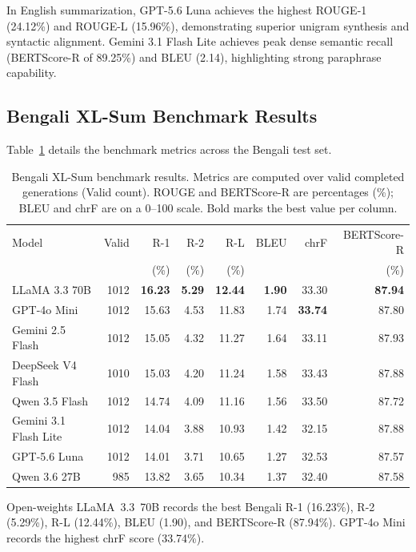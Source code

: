\documentclass[runningheads]{llncs}
\begin{document}
In English summarization, GPT-5.6 Luna achieves the highest ROUGE-1 (24.12\%) and ROUGE-L (15.96\%), demonstrating superior unigram synthesis and syntactic alignment. Gemini 3.1 Flash Lite achieves peak dense semantic recall (BERTScore-R of 89.25\%) and BLEU (2.14), highlighting strong paraphrase capability.

\subsection{Bengali XL-Sum Benchmark Results}\label{subsec:bengali_results}

Table~\ref{tab:bengali_results} details the benchmark metrics across the Bengali test set.

\begin{table}[t]
\caption{Bengali XL-Sum benchmark results. Metrics are computed over valid completed generations (Valid count). ROUGE and BERTScore-R are percentages (\%); BLEU and chrF are on a 0--100 scale. Bold marks the best value per column.}\label{tab:bengali_results}
\centering
\footnotesize
\begin{tabular}{p{3.2cm}rrrrrrr}
\toprule
Model & Valid & R-1 & R-2 & R-L & BLEU & chrF & BERTScore-R \\
 & & (\%) & (\%) & (\%) & & & (\%) \\
\midrule
LLaMA 3.3 70B & 1012 & \textbf{16.23} & \textbf{5.29} & \textbf{12.44} & \textbf{1.90} & 33.30 & \textbf{87.94} \\
GPT-4o Mini & 1012 & 15.63 & 4.53 & 11.83 & 1.74 & \textbf{33.74} & 87.80 \\
Gemini 2.5 Flash & 1012 & 15.05 & 4.32 & 11.27 & 1.64 & 33.11 & 87.93 \\
DeepSeek V4 Flash & 1010 & 15.03 & 4.20 & 11.24 & 1.58 & 33.43 & 87.88 \\
Qwen 3.5 Flash & 1012 & 14.74 & 4.09 & 11.16 & 1.56 & 33.50 & 87.72 \\
Gemini 3.1 Flash Lite & 1012 & 14.04 & 3.88 & 10.93 & 1.42 & 32.15 & 87.88 \\
GPT-5.6 Luna & 1012 & 14.01 & 3.71 & 10.65 & 1.27 & 32.53 & 87.57 \\
Qwen 3.6 27B & 985 & 13.82 & 3.65 & 10.34 & 1.37 & 32.40 & 87.58 \\
\bottomrule
\end{tabular}
\end{table}

Open-weights LLaMA~3.3~70B records the best Bengali R-1 (16.23\%), R-2 (5.29\%), R-L (12.44\%), BLEU (1.90), and BERTScore-R (87.94\%). GPT-4o Mini records the highest chrF score (33.74\%).
\end{document}
